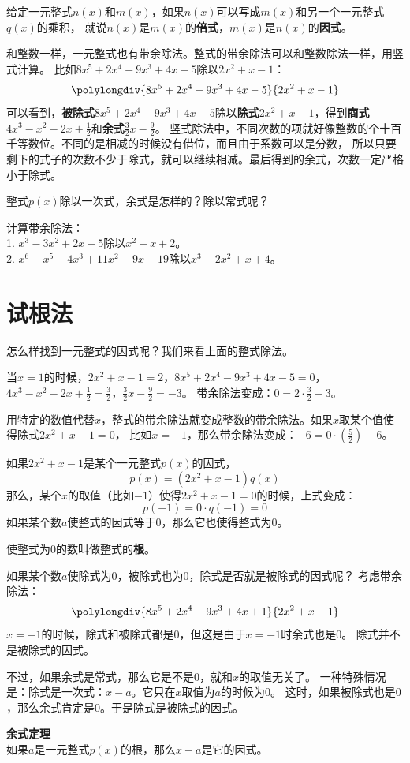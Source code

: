 \documentclass[12pt,UTF8]{ctexbook}
\begin{document}
给定一元整式$n(x)$和$m(x)$，如果$n(x)$可以写成$m(x)$和另一个一元整式$q(x)$的乘积，
就说$n(x)$是$m(x)$的\textbf{倍式}，$m(x)$是$n(x)$的\textbf{因式}。

和整数一样，一元整式也有带余除法。整式的带余除法可以和整数除法一样，用竖式计算。
比如$8x^5 +2x^4 -9x^3+ 4x-5$除以$2x^2+x-1$：
$$\polylongdiv{8x^5 +2x^4 -9x^3+ 4x-5}{2x^2+x-1}$$
可以看到，\textbf{被除式}$8x^5 +2x^4 -9x^3+ 4x-5$除以\textbf{除式}$2x^2+x-1$，得到\textbf{商式}$4x^3-x^2-2x+\frac12$和\textbf{余式}$\frac32 x- \frac92$。
竖式除法中，不同次数的项就好像整数的个十百千等数位。不同的是相减的时候没有借位，而且由于系数可以是分数，
所以只要剩下的式子的次数不少于除式，就可以继续相减。最后得到的余式，次数一定严格小于除式。
\begin{sk}\label{sk:2-0-0}
    整式$p(x)$除以一次式，余式是怎样的？除以常式呢？
\end{sk}
\begin{xt}\label{xt:2-0-0}
    计算带余除法：\\
    1. $x^3 - 3x^2 + 2x - 5$除以$x^2 + x + 2$。\\
    2. $x^6 - x^5 - 4x^3 + 11x^2 - 9x + 19$除以$x^3 - 2x^2 + x + 4$。
\end{xt}

\section{试根法}
怎么样找到一元整式的因式呢？我们来看上面的整式除法。

当$x=1$的时候，$2x^2+x-1 = 2$，$8x^5 +2x^4 -9x^3+ 4x-5 = 0$，
$4x^3-x^2-2x+\frac12 = \frac32$，$\frac32 x- \frac92 = -3$。
带余除法变成：$0 = 2 \cdot \frac32 - 3$。

用特定的数值代替$x$，整式的带余除法就变成整数的带余除法。如果$x$取某个值使得除式$2x^2 + x - 1 = 0$，
比如$x = -1$，那么带余除法变成：$-6 = 0\cdot \left(\frac52\right) - 6$。

如果$2x^2 + x - 1$是某个一元整式$p(x)$的因式，
$$ p(x) = (2x^2 + x - 1)q(x)$$
那么，某个$x$的取值（比如$-1$）使得$2x^2 + x - 1 = 0$的时候，上式变成：
$$ p(-1) = 0 \cdot q(-1) = 0$$
如果某个数$a$使整式的因式等于$0$，那么它也使得整式为$0$。

使整式为$0$的数叫做整式的\textbf{根}。

如果某个数$a$使除式为$0$，被除式也为$0$，除式是否就是被除式的因式呢？
考虑带余除法：
$$\polylongdiv{8x^5 +2x^4 -9x^3+ 4x+1}{2x^2+x-1}$$
$x = -1$的时候，除式和被除式都是$0$，但这是由于$x = -1$时余式也是$0$。
除式并不是被除式的因式。

不过，如果余式是常式，那么它是不是$0$，就和$x$的取值无关了。
一种特殊情况是：除式是一次式：$x - a$。它只在$x$取值为$a$的时候为$0$。
这时，如果被除式也是$0$，那么余式肯定是$0$。于是除式是被除式的因式。
\begin{tm}\textbf{余式定理}\label{tm:2-1-0}
    \mbox{} \\
    如果$a$是一元整式$p(x)$的根，那么$x-a$是它的因式。
\end{tm}
\end{document}
